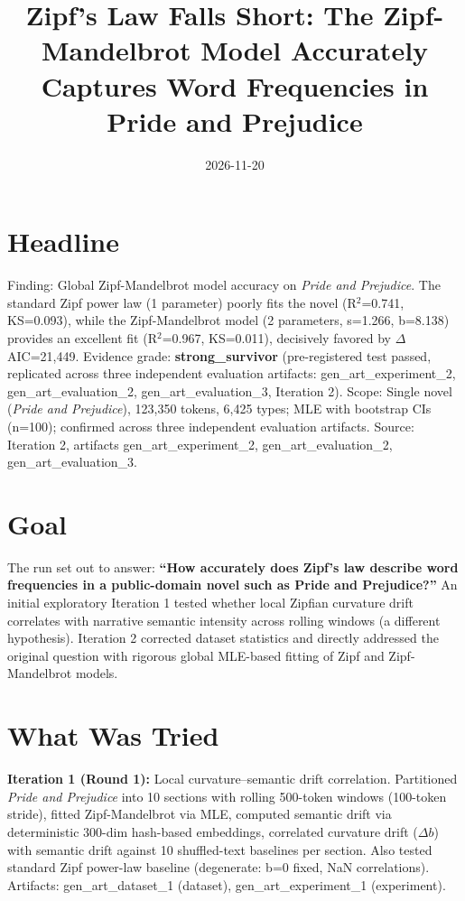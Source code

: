 \documentclass[11pt,letterpaper]{article}
\title{Zipf's Law Falls Short: The Zipf-Mandelbrot Model Accurately Captures Word Frequencies in Pride and Prejudice}
\date{2026-11-20}
\begin{document}
\maketitle

\section{Headline}

Finding: Global Zipf-Mandelbrot model accuracy on \textit{Pride and Prejudice}. The standard Zipf power law (1 parameter) poorly fits the novel (R$^2$=0.741, KS=0.093), while the Zipf-Mandelbrot model (2 parameters, s=1.266, b=8.138) provides an excellent fit (R$^2$=0.967, KS=0.011), decisively favored by $\Delta$AIC=21,449. Evidence grade: \textbf{strong\_survivor} (pre-registered test passed, replicated across three independent evaluation artifacts: gen\_art\_experiment\_2, gen\_art\_evaluation\_2, gen\_art\_evaluation\_3, Iteration 2). Scope: Single novel (\textit{Pride and Prejudice}), 123,350 tokens, 6,425 types; MLE with bootstrap CIs (n=100); confirmed across three independent evaluation artifacts. Source: Iteration 2, artifacts gen\_art\_experiment\_2, gen\_art\_evaluation\_2, gen\_art\_evaluation\_3.

\section{Goal}

The run set out to answer: \textbf{``How accurately does Zipf's law describe word frequencies in a public-domain novel such as Pride and Prejudice?''} An initial exploratory Iteration 1 tested whether local Zipfian curvature drift correlates with narrative semantic intensity across rolling windows (a different hypothesis). Iteration 2 corrected dataset statistics and directly addressed the original question with rigorous global MLE-based fitting of Zipf and Zipf-Mandelbrot models.

\section{What Was Tried}

\textbf{Iteration 1 (Round 1):} Local curvature--semantic drift correlation. Partitioned \textit{Pride and Prejudice} into 10 sections with rolling 500-token windows (100-token stride), fitted Zipf-Mandelbrot via MLE, computed semantic drift via deterministic 300-dim hash-based embeddings, correlated curvature drift ($\Delta b$) with semantic drift against 10 shuffled-text baselines per section. Also tested standard Zipf power-law baseline (degenerate: b=0 fixed, NaN correlations). Artifacts: gen\_art\_dataset\_1 (dataset), gen\_art\_experiment\_1 (experiment).
\end{document}
